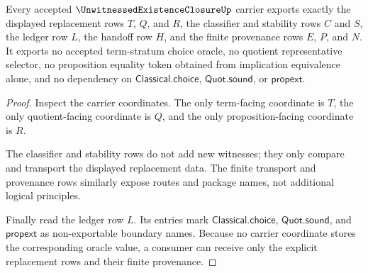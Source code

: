\begin{theorem}
\label{thm:unwitnessed-existence-closure-axiom-purity-boundary}
Every accepted $\UnwitnessedExistenceClosureUp$ carrier exports exactly the displayed replacement rows $T$, $Q$, and $R$, the classifier and stability rows $C$ and $S$, the ledger row $L$, the handoff row $H$, and the finite provenance rows $E$, $P$, and $N$. It exports no accepted term-stratum choice oracle, no quotient representative selector, no proposition equality token obtained from implication equivalence alone, and no dependency on $\mathsf{Classical.choice}$, $\mathsf{Quot.sound}$, or $\mathsf{propext}$.
\end{theorem}
\begin{proof}
Inspect the carrier coordinates. The only term-facing coordinate is $T$, the only quotient-facing coordinate is $Q$, and the only proposition-facing coordinate is $R$.

The classifier and stability rows do not add new witnesses; they only compare and transport the displayed replacement data. The finite transport and provenance rows similarly expose routes and package names, not additional logical principles.

Finally read the ledger row $L$. Its entries mark $\mathsf{Classical.choice}$, $\mathsf{Quot.sound}$, and $\mathsf{propext}$ as non-exportable boundary names. Because no carrier coordinate stores the corresponding oracle value, a consumer can receive only the explicit replacement rows and their finite provenance.
\end{proof}


